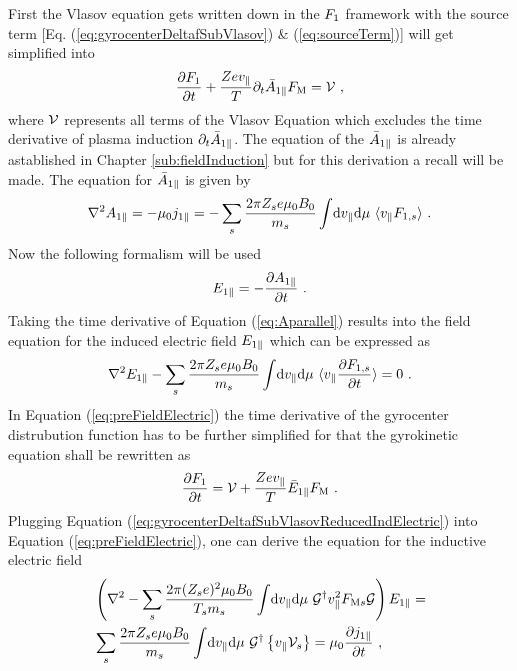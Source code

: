 First the Vlasov equation gets written down in the $F_1$ framework with the source term [Eq. (\ref{eq:gyrocenterDeltafSubVlasov}) \& (\ref{eq:sourceTerm})] will get simplified into 
\begin{gather}
    \frac{\partial F_1}{\partial t} + \frac{Ze v_\parallel}{T} \partial_t \bar{A}_{1\parallel} F_\mathrm{M} = \mathcal{V}~,
    \label{eq:gyrocenterDeltafSubVlasovReduced}
\end{gather}
where $\mathcal{V}$ represents all terms of the Vlasov Equation which excludes the time derivative of plasma induction $\partial_t \bar{A}_{1\parallel}$. The equation of the $\bar{A}_{1\parallel}$ is already astablished in Chapter \ref{sub:fieldInduction} but for this derivation a recall will be made. The equation for $\bar{A}_{1\parallel}$ is given by
\begin{gather}
    \nabla^2 A_{1\parallel} = - \mu_0 j_{1\parallel} = - \sum_s \frac{2\pi Z_se \mu_0 B_0}{m_s} \int \! \mathrm{d}v_\parallel\mathrm{d}\mu ~ \langle v_\parallel F_{1,s}\rangle~.
    \label{eq:Aparallel}
\end{gather}
Now the following formalism will be used
\begin{gather}
	E_{1\parallel} = - \frac{\partial A_{1\parallel}}{\partial t}~.
	\label{eq:faradayLaw}
\end{gather}
Taking the time derivative of Equation (\ref{eq:Aparallel}) results into the field equation for the induced electric field $
E_{1\parallel}$ which can be expressed as
\begin{gather}
	\nabla^2 E_{1\parallel} - \sum_s \frac{2\pi Z_se \mu_0 B_0}{m_s} \int \! \mathrm{d}v_\parallel\mathrm{d}\mu ~ \langle v_\parallel \frac{\partial F_{1,s}}{\partial t}\rangle = 0 ~.
	\label{eq:preFieldElectric}
\end{gather}
In Equation (\ref{eq:preFieldElectric}) the time derivative of the gyrocenter distrubution function has to be further simplified for that the gyrokinetic equation shall be rewritten as 
\begin{gather}
	\frac{\partial F_1}{\partial t} = \mathcal{V} + \frac{Ze v_\parallel}{T} \bar{E}_{1\parallel} F_\mathrm{M}~.
	\label{eq:gyrocenterDeltafSubVlasovReducedIndElectric}
\end{gather}
Plugging Equation (\ref{eq:gyrocenterDeltafSubVlasovReducedIndElectric}) into Equation (\ref{eq:preFieldElectric}), one can derive the equation for the inductive electric field 
\begin{gather}
	\begin{aligned}
		&\left(\nabla^2 - \sum_s \frac{2\pi (Z_se)^2 \mu_0 B_0}{T_sm_s} \int \! \mathrm{d}v_\parallel\mathrm{d}\mu ~ \mathcal{G}^\dagger v_\parallel^2 F_{\mathrm{M}s} \mathcal{G}\right) E_{1\parallel} = \\
		&\sum_s \frac{2\pi Z_se \mu_0 B_0}{m_s}  \int \! \mathrm{d}v_\parallel\mathrm{d}\mu ~ \mathcal{G}^\dagger \left\{v_\parallel \mathcal{V}_s\right\} = \mu_0 \frac{\partial j_{1\parallel}}{\partial t}~,
	\end{aligned}
	\label{eq:fieldElectric}
\end{gather}
